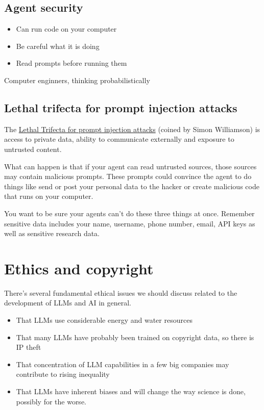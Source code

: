 \documentclass[
  letterpaper,
  DIV=11,
  numbers=noendperiod]{scrreprt}
\providecommand{\tightlist}{%
  \setlength{\itemsep}{0pt}\setlength{\parskip}{0pt}}\usepackage{longtable,booktabs,array}
\begin{document}
\section{Agent security}\label{agent-security}

\begin{itemize}
\tightlist
\item
  Can run code on your computer
\item
  Be careful what it is doing
\item
  Read prompts before running them
\end{itemize}

Computer enginners, thinking probabilistically

\section{Lethal trifecta for prompt injection
attacks}\label{lethal-trifecta-for-prompt-injection-attacks}

The \href{https://simonwillison.net/2025/Aug/9/bay-area-ai/}{Lethal
Trifecta for prompt injection attacks} (coined by Simon Williamson) is
access to private data, ability to communicate externally and exposure
to untrusted content.

What can happen is that if your agent can read untrusted sources, those
sources may contain malicious prompts. These prompts could convince the
agent to do things like send or post your personal data to the hacker or
create malicious code that runs on your computer.

You want to be sure your agents can't do these three things at once.
Remember sensitive data includes your name, username, phone number,
email, API keys as well as sensitive research data.


\chapter{Ethics and copyright}\label{ethics-and-copyright}

There's several fundamental ethical issues we should discuss related to
the development of LLMs and AI in general.

\begin{itemize}
\tightlist
\item
  That LLMs use considerable energy and water resources
\item
  That many LLMs have probably been trained on copyright data, so there
  is IP theft
\item
  That concentration of LLM capabilities in a few big companies may
  contribute to rising inequality
\item
  That LLMs have inherent biases and will change the way science is
  done, possibly for the worse.
\end{itemize}
\end{document}
